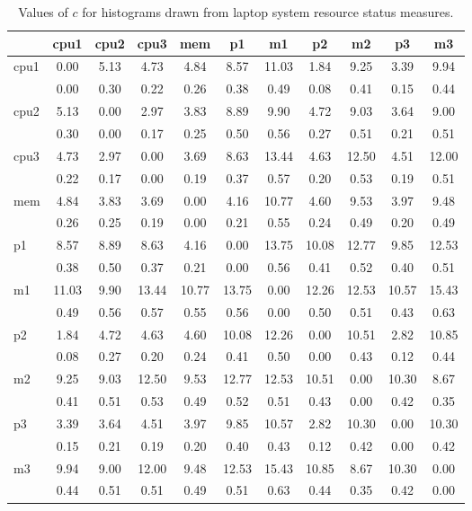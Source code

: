 \begin{table}[h!]
\begin{center}
\begin{tabular}{| l | c | c | c | c | c | c | c | c | c | c |}\hline
 & cpu1 & cpu2 & cpu3 & mem & p1 & m1 & p2 & m2 & p3 & m3 \\\hline
cpu1 & 0.00  & 5.13  & 4.73  & 4.84  & 8.57  & 11.03  & 1.84  & 9.25  & 3.39  & 9.94 \\\hline
 & 0.00  & 0.30  & 0.22  & 0.26  & 0.38  & 0.49  & 0.08  & 0.41  & 0.15  & 0.44 \\\hline
cpu2 & 5.13  & 0.00  & 2.97  & 3.83  & 8.89  & 9.90  & 4.72  & 9.03  & 3.64  & 9.00 \\\hline
 & 0.30  & 0.00  & 0.17  & 0.25  & 0.50  & 0.56  & 0.27  & 0.51  & 0.21  & 0.51 \\\hline
cpu3 & 4.73  & 2.97  & 0.00  & 3.69  & 8.63  & 13.44  & 4.63  & 12.50  & 4.51  & 12.00 \\\hline
 & 0.22  & 0.17  & 0.00  & 0.19  & 0.37  & 0.57  & 0.20  & 0.53  & 0.19  & 0.51 \\\hline
mem & 4.84  & 3.83  & 3.69  & 0.00  & 4.16  & 10.77  & 4.60  & 9.53  & 3.97  & 9.48 \\\hline
 & 0.26  & 0.25  & 0.19  & 0.00  & 0.21  & 0.55  & 0.24  & 0.49  & 0.20  & 0.49 \\\hline
p1 & 8.57  & 8.89  & 8.63  & 4.16  & 0.00  & 13.75  & 10.08  & 12.77  & 9.85  & 12.53 \\\hline
 & 0.38  & 0.50  & 0.37  & 0.21  & 0.00  & 0.56  & 0.41  & 0.52  & 0.40  & 0.51 \\\hline
m1 & 11.03  & 9.90  & 13.44  & 10.77  & 13.75  & 0.00  & 12.26  & 12.53  & 10.57  & 15.43 \\\hline
 & 0.49  & 0.56  & 0.57  & 0.55  & 0.56  & 0.00  & 0.50  & 0.51  & 0.43  & 0.63 \\\hline
p2 & 1.84  & 4.72  & 4.63  & 4.60  & 10.08  & 12.26  & 0.00  & 10.51  & 2.82  & 10.85 \\\hline
 & 0.08  & 0.27  & 0.20  & 0.24  & 0.41  & 0.50  & 0.00  & 0.43  & 0.12  & 0.44 \\\hline
m2 & 9.25  & 9.03  & 12.50  & 9.53  & 12.77  & 12.53  & 10.51  & 0.00  & 10.30  & 8.67 \\\hline
 & 0.41  & 0.51  & 0.53  & 0.49  & 0.52  & 0.51  & 0.43  & 0.00  & 0.42  & 0.35 \\\hline
p3 & 3.39  & 3.64  & 4.51  & 3.97  & 9.85  & 10.57  & 2.82  & 10.30  & 0.00  & 10.30 \\\hline
 & 0.15  & 0.21  & 0.19  & 0.20  & 0.40  & 0.43  & 0.12  & 0.42  & 0.00  & 0.42 \\\hline
m3 & 9.94  & 9.00  & 12.00  & 9.48  & 12.53  & 15.43  & 10.85  & 8.67  & 10.30  & 0.00 \\\hline
 & 0.44  & 0.51  & 0.51  & 0.49  & 0.51  & 0.63  & 0.44  & 0.35  & 0.42  & 0.00 \\\hline
\end{tabular}
\caption{Values of $c$ for histograms drawn from laptop system resource status measures.}
\end{center}
\end{table}